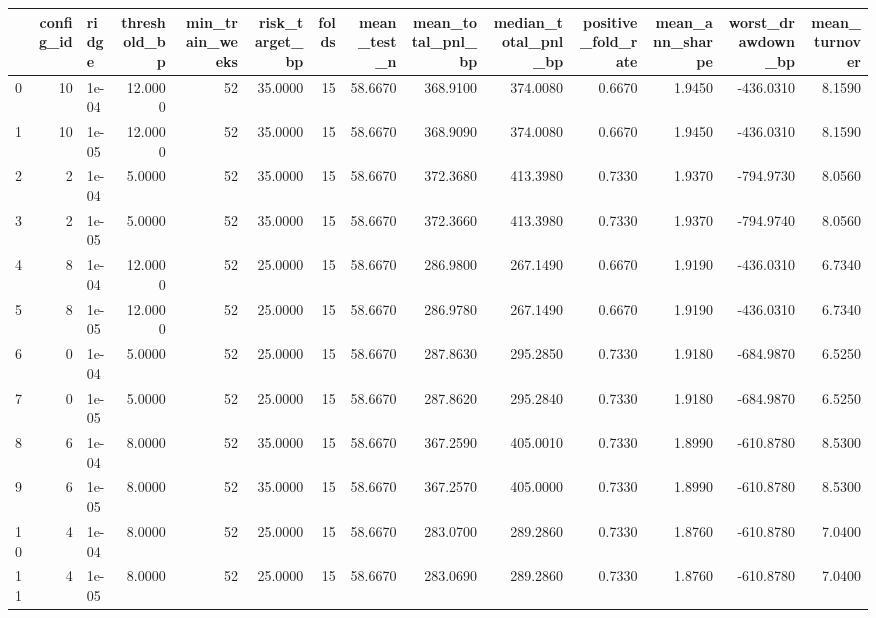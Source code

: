 \begin{tabular}{lrlrrrrrrrrrrr}
\toprule
 & config\_id & ridge & threshold\_bp & min\_train\_weeks & risk\_target\_bp & folds & mean\_test\_n & mean\_total\_pnl\_bp & median\_total\_pnl\_bp & positive\_fold\_rate & mean\_ann\_sharpe & worst\_drawdown\_bp & mean\_turnover \\
\midrule
0 & 10 & 1e-04 & 12.0000 & 52 & 35.0000 & 15 & 58.6670 & 368.9100 & 374.0080 & 0.6670 & 1.9450 & -436.0310 & 8.1590 \\
1 & 10 & 1e-05 & 12.0000 & 52 & 35.0000 & 15 & 58.6670 & 368.9090 & 374.0080 & 0.6670 & 1.9450 & -436.0310 & 8.1590 \\
2 & 2 & 1e-04 & 5.0000 & 52 & 35.0000 & 15 & 58.6670 & 372.3680 & 413.3980 & 0.7330 & 1.9370 & -794.9730 & 8.0560 \\
3 & 2 & 1e-05 & 5.0000 & 52 & 35.0000 & 15 & 58.6670 & 372.3660 & 413.3980 & 0.7330 & 1.9370 & -794.9740 & 8.0560 \\
4 & 8 & 1e-04 & 12.0000 & 52 & 25.0000 & 15 & 58.6670 & 286.9800 & 267.1490 & 0.6670 & 1.9190 & -436.0310 & 6.7340 \\
5 & 8 & 1e-05 & 12.0000 & 52 & 25.0000 & 15 & 58.6670 & 286.9780 & 267.1490 & 0.6670 & 1.9190 & -436.0310 & 6.7340 \\
6 & 0 & 1e-04 & 5.0000 & 52 & 25.0000 & 15 & 58.6670 & 287.8630 & 295.2850 & 0.7330 & 1.9180 & -684.9870 & 6.5250 \\
7 & 0 & 1e-05 & 5.0000 & 52 & 25.0000 & 15 & 58.6670 & 287.8620 & 295.2840 & 0.7330 & 1.9180 & -684.9870 & 6.5250 \\
8 & 6 & 1e-04 & 8.0000 & 52 & 35.0000 & 15 & 58.6670 & 367.2590 & 405.0010 & 0.7330 & 1.8990 & -610.8780 & 8.5300 \\
9 & 6 & 1e-05 & 8.0000 & 52 & 35.0000 & 15 & 58.6670 & 367.2570 & 405.0000 & 0.7330 & 1.8990 & -610.8780 & 8.5300 \\
10 & 4 & 1e-04 & 8.0000 & 52 & 25.0000 & 15 & 58.6670 & 283.0700 & 289.2860 & 0.7330 & 1.8760 & -610.8780 & 7.0400 \\
11 & 4 & 1e-05 & 8.0000 & 52 & 25.0000 & 15 & 58.6670 & 283.0690 & 289.2860 & 0.7330 & 1.8760 & -610.8780 & 7.0400 \\
\bottomrule
\end{tabular}
